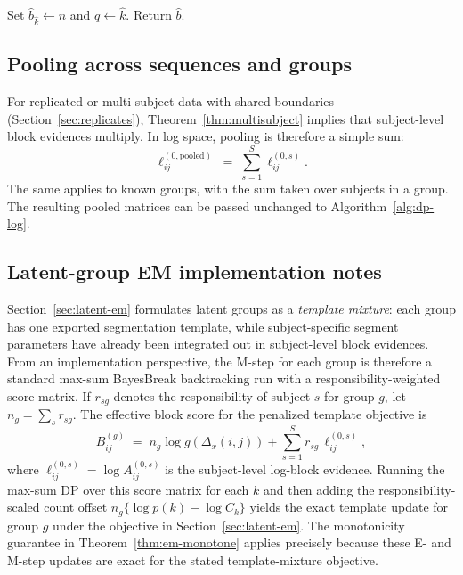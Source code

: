 \begin{algorithm}[H]
\caption{MAPBacktrack$(h^\star,\widehat{k})$}
\label{alg:map-backtrack}
\BlankLine
Set $\widehat{b}_{\widehat{k}}\leftarrow n$ and $q\leftarrow\widehat{k}$.
Return $\widehat{b}$.
\end{algorithm}

\subsection{Pooling across sequences and groups}
\label{sec:alg-pooling}

For replicated or multi-subject data with shared boundaries (Section~\ref{sec:replicates}),
Theorem~\ref{thm:multisubject} implies that subject-level block evidences multiply.
In log space, pooling is therefore a simple sum:
\begin{equation}
    \ell^{(0,\text{pooled})}_{ij} \;=\; \sum_{s=1}^S \ell^{(0,s)}_{ij}.
\end{equation}
The same applies to known groups, with the sum taken over subjects in a group.
The resulting pooled matrices can be passed unchanged to Algorithm~\ref{alg:dp-log}.

\subsection{Latent-group EM implementation notes}
\label{sec:alg-em}

Section~\ref{sec:latent-em} formulates latent groups as a \emph{template mixture}: each group has one
exported segmentation template, while subject-specific segment parameters have already been integrated out in
subject-level block evidences. From an implementation perspective, the M-step for each group is therefore a
standard max-sum BayesBreak backtracking run with a responsibility-weighted score matrix.
If $r_{sg}$ denotes the responsibility of subject $s$ for group $g$, let
$n_g=\sum_s r_{sg}$. The effective block score for the penalized template objective is
\begin{equation}
    B^{(g)}_{ij}
    \;=\; n_g\log g(\Delta_x(i,j)) + \sum_{s=1}^S r_{sg}\, \ell^{(0,s)}_{ij},
\end{equation}
where $\ell^{(0,s)}_{ij}=\log A^{(0,s)}_{ij}$ is the subject-level log-block evidence.
Running the max-sum DP over this score matrix for each $k$ and then adding the responsibility-scaled
count offset $n_g\{\log p(k)-\log C_k\}$ yields the exact template update for group $g$ under the
objective in Section~\ref{sec:latent-em}.
The monotonicity guarantee in Theorem~\ref{thm:em-monotone} applies precisely because these E- and M-step
updates are exact for the stated template-mixture objective.

